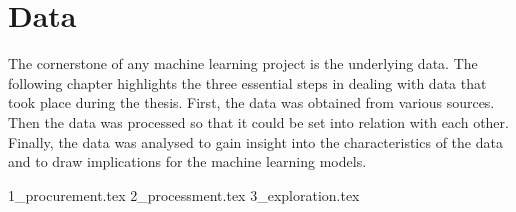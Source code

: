 \clearpage \section{Data}

The cornerstone of any machine learning project is the underlying data. The following chapter highlights the three essential steps in dealing with data that took place during the thesis. First, the data was obtained from various sources. Then the data was processed so that it could be set into relation with each other. Finally, the data was analysed to gain insight into the characteristics of the data and to draw implications for the machine learning models.

{1_procurement.tex}
{2_processment.tex}
{3_exploration.tex}
